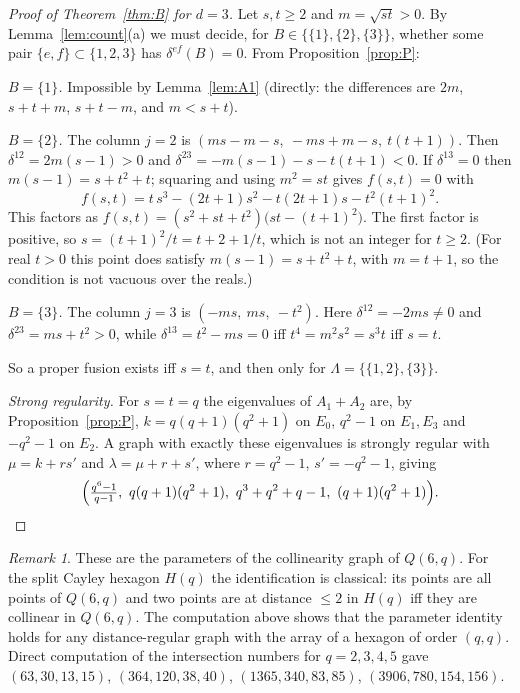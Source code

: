 \documentclass[11pt]{article}
\theoremstyle{remark}
\newtheorem{remark}[theorem]{Remark}
\begin{document}
\begin{proof}[Proof of Theorem~\ref{thm:B} for $d=3$]
Let $s,t\ge2$ and $m=\sqrt{st}>0$. By Lemma~\ref{lem:count}(a) we must decide, for $B\in\{\{1\},\{2\},\{3\}\}$, whether some pair $\{e,f\}\subset\{1,2,3\}$ has $\delta^{ef}(B)=0$. From Proposition~\ref{prop:P}:

\smallskip\noindent\emph{$B=\{1\}$.} Impossible by Lemma~\ref{lem:A1} (directly: the differences are $2m$, $s+t+m$, $s+t-m$, and $m<s+t$).

\smallskip\noindent\emph{$B=\{2\}$.} The column $j=2$ is $(ms-m-s,\ -ms+m-s,\ t(t+1))$. Then $\delta^{12}=2m(s-1)>0$ and $\delta^{23}=-m(s-1)-s-t(t+1)<0$. If $\delta^{13}=0$ then $m(s-1)=s+t^2+t$; squaring and using $m^2=st$ gives $f(s,t)=0$ with
\[
f(s,t)=t\,s^3-(2t+1)s^2-t(2t+1)s-t^2(t+1)^2 .
\]
This factors as $f(s,t)=(s^2+st+t^2)\bigl(st-(t+1)^2\bigr)$. The first factor is positive, so $s=(t+1)^2/t=t+2+1/t$, which is not an integer for $t\ge2$. (For real $t>0$ this point does satisfy $m(s-1)=s+t^2+t$, with $m=t+1$, so the condition is not vacuous over the reals.)

\smallskip\noindent\emph{$B=\{3\}$.} The column $j=3$ is $(-ms,\ ms,\ -t^2)$. Here $\delta^{12}=-2ms\ne0$ and $\delta^{23}=ms+t^2>0$, while $\delta^{13}=t^2-ms=0$ iff $t^4=m^2s^2=s^3t$ iff $s=t$.

So a proper fusion exists iff $s=t$, and then only for $\Lambda=\{\{1,2\},\{3\}\}$.

\smallskip\noindent\emph{Strong regularity.} For $s=t=q$ the eigenvalues of $A_1+A_2$ are, by Proposition~\ref{prop:P}, $k=q(q+1)(q^2+1)$ on $E_0$, $q^2-1$ on $E_1,E_3$ and $-q^2-1$ on $E_2$. A graph with exactly these eigenvalues is strongly regular with $\mu=k+rs'$ and $\lambda=\mu+r+s'$, where $r=q^2-1$, $s'=-q^2-1$, giving
\[
\Bigl(\tfrac{q^6-1}{q-1},\ q(q+1)(q^2+1),\ q^3+q^2+q-1,\ (q+1)(q^2+1)\Bigr).
\]
\end{proof}

\begin{remark}\label{rem:hex}
These are the parameters of the collinearity graph of $Q(6,q)$. For the split Cayley hexagon $H(q)$ the identification is classical: its points are all points of $Q(6,q)$ and two points are at distance $\le2$ in $H(q)$ iff they are collinear in $Q(6,q)$. The computation above shows that the parameter identity holds for any distance-regular graph with the array of a hexagon of order $(q,q)$. Direct computation of the intersection numbers for $q=2,3,4,5$ gave $(63,30,13,15)$, $(364,120,38,40)$, $(1365,340,83,85)$, $(3906,780,154,156)$.
\end{remark}
\end{document}
